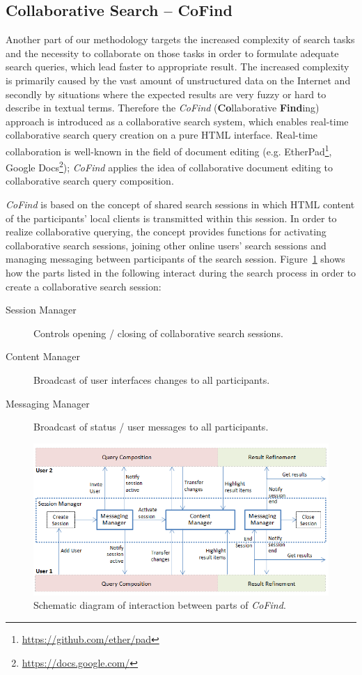 \documentclass[runningheads,a4paper]{llncs} \usepackage[utf8]{inputenc}
\begin{document}
\subsection{Collaborative Search -- CoFind}
Another part of our methodology targets the increased complexity of search tasks and the necessity to collaborate on those tasks in order to formulate adequate search queries, which lead faster to appropriate result. The increased
complexity is primarily caused by the vast amount of unstructured data on the Internet and secondly by situations where the expected results are very fuzzy or hard to describe in textual terms. Therefore the \emph{CoFind} (\textbf{Co}llaborative \textbf{Find}ing) approach is introduced as a collaborative search system, which enables real-time collaborative search query creation on a pure HTML interface. Real-time collaboration is well-known in the field of document editing (e.g. EtherPad\footnote{\url{https://github.com/ether/pad}}, Google  Docs\footnote{\url{https://docs.google.com/}}); \emph{CoFind} applies the idea of collaborative document editing to collaborative search query composition.

\emph{CoFind} is based on the concept of shared search sessions in which HTML content of the participants' local clients is transmitted within this session. In order to realize collaborative querying, the concept provides functions for activating collaborative search sessions, joining other online users' search sessions and managing messaging between participants of the search session. Figure~\ref{fig:cofind} shows how the parts listed in the following interact during the search process in order to create a collaborative search session:
\begin{description}
  \item [Session Manager] Controls opening / closing of collaborative search sessions.
  \item [Content Manager] Broadcast of user interfaces changes to all participants.
  \item [Messaging Manager] Broadcast of status / user messages to all participants.
\end{description}

\begin{figure}[h!]
  \centering
    \includegraphics[width=0.75\linewidth]{resources/cofind-workflow.png}
  \caption{Schematic diagram of interaction between parts of \emph{CoFind}.}
  \label{fig:cofind}
\end{figure}
 
\end{document}
